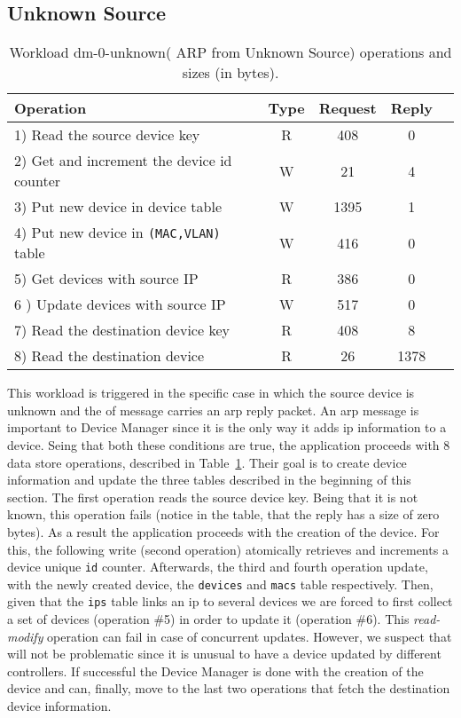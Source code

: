 \subsection{Unknown Source}
\small
\begin{table}[ht]
\centering 
\begin{tabular}{l c c c c}
Operation & Type & Request & Reply \\ \toprule 
1) Read the source device key & R & 408 & 0\\
2) Get and increment the device id counter & W & 21 & 4\\
3) Put new device in device table & W & 1395 & 1\\
4) Put new device in \texttt{(MAC,VLAN)} table & W & 416 & 0\\
5) Get devices with source IP & R & 386 & 0\\
6 ) Update devices with source IP & W & 517 & 0\\
7) Read the destination device key & R & 408 & 8\\
8) Read the destination device & R & 26 & 1378 \\\bottomrule
\end{tabular}
\caption[Workload dm-0-unknown( ARP from Unknown Source)
operations]{Workload dm-0-unknown( ARP from Unknown Source) operations
  and sizes (in bytes).}
\label{table:ops:dm-0-unknown}
\end{table}


This workload is triggered in the specific case in which  the source device is unknown and the \gls{of} message carries an \gls{arp} reply 
packet. 
An \gls{arp} message is important to Device Manager since it is the only way it adds \gls{ip} information to a device. 
Seing that both these  conditions are true, the application proceeds  with 8 data store operations, described in Table~\ref{table:ops:dm-0-unknown}. 
Their goal is to create device information and update the three tables described  in the beginning of this section.  
The first operation reads the  source device key. 
Being that it is not known, this operation fails (notice in the table, that the reply has a size  of zero bytes).
As a result the application proceeds with the creation of the device. 
For this, the following write (second operation) atomically retrieves and increments a device unique \texttt{id} counter. 
Afterwards, the third and fourth  operation update, with the newly created device, the \texttt{devices} and \texttt{macs} table respectively. 
Then, given that the \texttt{ips} table  links an \gls{ip} to several devices we are forced to first collect a set of devices  (operation \#5) in order to update it (operation \#6).  
This \emph{read-modify} operation can fail in case of concurrent updates.
However, we suspect that will not be problematic since it is unusual to have a device updated by different controllers.
If successful the Device Manager is done with the creation of the device and can, finally, move to the last two operations that fetch the destination device information. 


